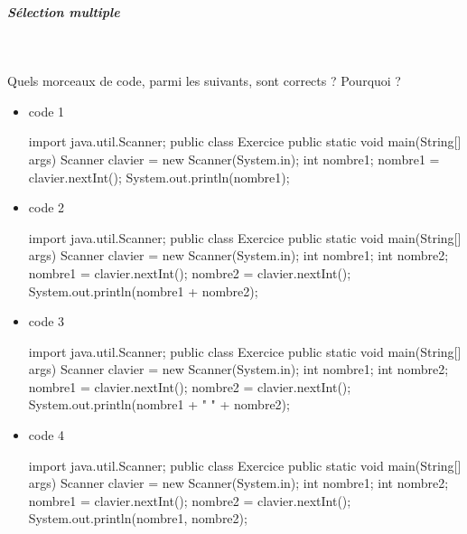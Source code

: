 \documentclass[11pt,a4paper]{article}
\begin{document}
		\subparagraph{S\'election multiple} 
		
                \textcolor{white}{.} \par
            Quels morceaux de code, parmi les suivants, sont corrects ? Pourquoi ?
						
            \begin{itemize} 
        
            \item[ \ding{"6F} ]  
							code 1
							\begin{Java}
    import java.util.Scanner;
    public class Exercice { 
        public static void main(String[] args) { 
            Scanner clavier = new Scanner(System.in); 
            int nombre1; 
            nombre1 = clavier.nextInt();
            System.out.println(nombre1);
        } 
    }						\end{Java}
        
            \item[ \ding{"6F} ]  
							code 2
							\begin{Java}
    import java.util.Scanner;
    public class Exercice {  
        public static void main(String[] args) {
            Scanner clavier = new Scanner(System.in);
            int nombre1;
            int nombre2;
            nombre1 = clavier.nextInt();
            nombre2 = clavier.nextInt();
            System.out.println(nombre1 + nombre2);
        }  
    }						\end{Java}
        
            \item[ \ding{"6F} ]  
							code 3
							\begin{Java}
    import java.util.Scanner;
    public class Exercice {  
        public static void main(String[] args) {
            Scanner clavier = new Scanner(System.in);
            int nombre1;
            int nombre2;
            nombre1 = clavier.nextInt();
            nombre2 = clavier.nextInt();
            System.out.println(nombre1 + " " + nombre2);
        }  
    }						\end{Java}
        
            \item[ \ding{"6F} ]  
							code 4
							\begin{Java}
    import java.util.Scanner;
    public class Exercice {  
        public static void main(String[] args) {
            Scanner clavier = new Scanner(System.in);
            int nombre1;
            int nombre2;
            nombre1 = clavier.nextInt();
            nombre2 = clavier.nextInt();
            System.out.println(nombre1, nombre2);
        }  
    }						\end{Java}
        
            \end{itemize} 
        
\end{document}
